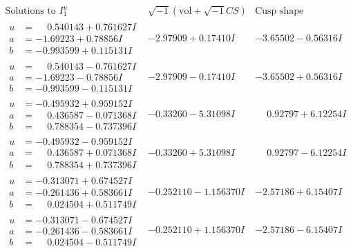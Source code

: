 \documentclass[1p]{elsarticle_modified}
\theoremstyle{definition}
\newcommand{\I}{\sqrt{-1}}
\begin{document}
$$\begin{array}{c|c|c}  
\text{Solutions to }I^u_{1}& \I (\text{vol} + \sqrt{-1}CS) & \text{Cusp shape}\\
 \hline 
\begin{aligned}
u &= \phantom{-}0.540143 + 0.761627 I \\
a &= -1.69223 + 0.78856 I \\
b &= -0.993599 + 0.115131 I\end{aligned}
 & -2.97909 + 0.17410 I & -3.65502 - 0.56316 I \\ \hline\begin{aligned}
u &= \phantom{-}0.540143 - 0.761627 I \\
a &= -1.69223 - 0.78856 I \\
b &= -0.993599 - 0.115131 I\end{aligned}
 & -2.97909 - 0.17410 I & -3.65502 + 0.56316 I \\ \hline\begin{aligned}
u &= -0.495932 + 0.959152 I \\
a &= \phantom{-}0.436587 - 0.071368 I \\
b &= \phantom{-}0.788354 - 0.737396 I\end{aligned}
 & -0.33260 - 5.31098 I & \phantom{-}0.92797 + 6.12254 I \\ \hline\begin{aligned}
u &= -0.495932 - 0.959152 I \\
a &= \phantom{-}0.436587 + 0.071368 I \\
b &= \phantom{-}0.788354 + 0.737396 I\end{aligned}
 & -0.33260 + 5.31098 I & \phantom{-}0.92797 - 6.12254 I \\ \hline\begin{aligned}
u &= -0.313071 + 0.674527 I \\
a &= -0.261436 + 0.583661 I \\
b &= \phantom{-}0.024504 + 0.511749 I\end{aligned}
 & -0.252110 - 1.156370 I & -2.57186 + 6.15407 I \\ \hline\begin{aligned}
u &= -0.313071 - 0.674527 I \\
a &= -0.261436 - 0.583661 I \\
b &= \phantom{-}0.024504 - 0.511749 I\end{aligned}
 & -0.252110 + 1.156370 I & -2.57186 - 6.15407 I \\ \hline\begin{aligned}

\end{aligned}
\end{array}$$
\end{document}

